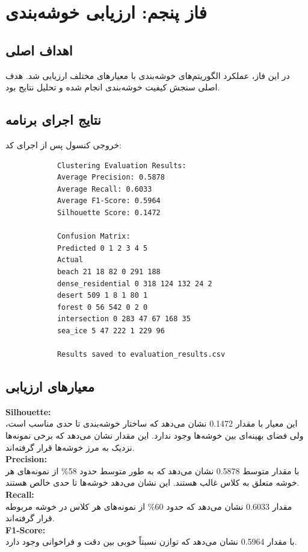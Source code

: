 \documentclass[a4paper,12pt]{article}
\let\nobreaksection\section
\renewcommand{\section}{\nobreaksection}
\begin{document}
	
	\section{فاز پنجم: ارزیابی خوشه‌بندی}
	
	\subsection*{\textbf{اهداف اصلی}}
	در این فاز، عملکرد الگوریتم‌های خوشه‌بندی با معیارهای مختلف ارزیابی شد. هدف اصلی سنجش کیفیت خوشه‌بندی انجام شده و تحلیل نتایج بود.
	\subsection*{\textbf{نتایج اجرای برنامه}}
	خروجی کنسول پس از اجرای کد:
	
	\begin{latin}
		\begin{verbatim}
			Clustering Evaluation Results:
			Average Precision: 0.5878
			Average Recall: 0.6033
			Average F1-Score: 0.5964
			Silhouette Score: 0.1472
			
			Confusion Matrix:
			Predicted 0 1 2 3 4 5
			Actual
			beach 21 18 82 0 291 188
			dense_residential 0 318 124 132 24 2
			desert 509 1 8 1 80 1
			forest 0 56 542 0 2 0
			intersection 0 283 47 67 168 35
			sea_ice 5 47 222 1 229 96
			
			Results saved to evaluation_results.csv
		\end{verbatim}
	\end{latin}
	\subsection*{\textbf{معیارهای ارزیابی}}
	
	\textbf{ Silhouette:}
	\\
	این معیار با مقدار 0.1472 نشان می‌دهد که ساختار خوشه‌بندی تا حدی مناسب است، ولی فضای بهینه‌ای بین خوشه‌ها وجود ندارد. این مقدار نشان می‌دهد که برخی نمونه‌ها نزدیک به مرز خوشه‌ها قرار گرفته‌اند.
	\\
	\textbf{ Precision:}
	\\
	با مقدار متوسط 0.5878 نشان می‌دهد که به طور متوسط حدود 58\% از نمونه‌های هر خوشه متعلق به کلاس غالب هستند. این نشان می‌دهد خوشه‌ها تا حدی خالص هستند.
	\\
	\textbf{Recall:}
	\\
	مقدار 0.6033 نشان می‌دهد که حدود 60\% از نمونه‌های هر کلاس در خوشه مربوطه قرار گرفته‌اند.
	\\
	\textbf{F1-Score:}
	\\
	با مقدار 0.5964 نشان می‌دهد که توازن نسبتاً خوبی بین دقت و فراخوانی وجود دارد.
	
\end{document}

